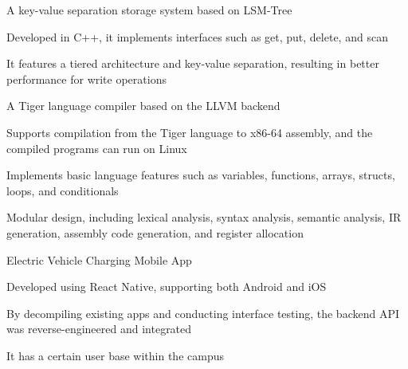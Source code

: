 \documentclass[]{deedy-resume-openfont}
\begin{document}
\begin{minipage}[t]{0.73\textwidth}
\begin{tightemize}
    \item A key-value separation storage system based on LSM-Tree
    \item Developed in C++, it implements interfaces such as get, put, delete, and scan
    \item It features a tiered architecture and key-value separation, resulting in better performance for write operations
\end{tightemize}
\sectionsep


\begin{tightemize}
    \item A Tiger language compiler based on the LLVM backend
    \item Supports compilation from the Tiger language to x86-64 assembly, and the compiled programs can run on Linux
    \item Implements basic language features such as variables, functions, arrays, structs, loops, and conditionals
    \item Modular design, including lexical analysis, syntax analysis, semantic analysis, IR generation, assembly code generation, and register allocation
\end{tightemize}
\sectionsep

\begin{tightemize}
    \item Electric Vehicle Charging Mobile App
    \item Developed using React Native, supporting both Android and iOS
    \item By decompiling existing apps and conducting interface testing, the backend API was reverse-engineered and integrated
    \item It has a certain user base within the campus
\end{tightemize}
\sectionsep



\end{minipage}
\end{document}
